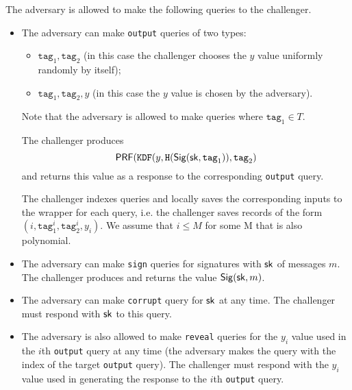 \documentclass{article}
\begin{document}
% 

The adversary is allowed to make the following queries to the challenger.


\begin{itemize}
	
	\item The adversary can make \texttt{output} queries of two types:
	\begin{itemize}
		\item $\texttt{tag}_1, \texttt{tag}_2$ (in this case the challenger chooses the $y$ value uniformly randomly by itself);
		\item $\texttt{tag}_1, \texttt{tag}_2,y$ (in this case the $y$ value is chosen by the adversary).
	\end{itemize}
	
	Note that the adversary is allowed to make queries where $\texttt{tag}_1 \in T$. 
	
	The challenger produces $$
	\mathsf{PRF}(\texttt{KDF}(y, \texttt{H}(\mathsf{Sig} (\mathsf{sk},\texttt{tag}_1)), \texttt{tag}_2 )
	$$
	and returns this value as a response to the corresponding \texttt{output} query.
	
	The challenger indexes queries and locally saves the corresponding inputs to the wrapper for each query, i.e. the challenger saves records of the form $(i,\texttt{tag}_1^i,\texttt{tag}_2^i,y_i)$.  We assume that $i \le M$ for some M that is also polynomial.
	
	\item The adversary can make \texttt{sign} queries for signatures with $\mathsf{sk}$ of messages $m$. The challenger produces and returns the value $\mathsf{Sig} (\mathsf{sk}, m)$.
	
	\item The adversary can make \texttt{corrupt} query for $\mathsf{sk}$ at any time. The challenger must respond with $\mathsf{sk}$ to this query.
	
	\item The adversary is also allowed to make \texttt{reveal} queries for the $y_i$ value used in the $i$th \texttt{output} query at any time (the adversary makes the query with the index of the target \texttt{output} query). The challenger must respond with the $y_i$ value used in generating the response to the $i$th \texttt{output} query.
	

\end{itemize}
\end{document}
